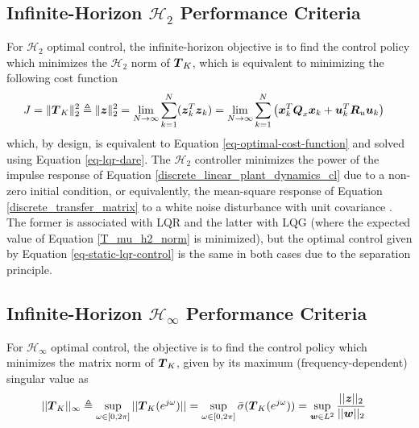 \subsection{Infinite-Horizon $\mathcal{H}_{2}$ Performance Criteria}
For $\mathcal{H}_{2}$ optimal control, the infinite-horizon objective is to find the control policy which minimizes the $\mathcal{H}_{2}$ norm of $\vb*{T}_{K}$, which is equivalent to minimizing the following cost function
\begin{equation}
\begin{aligned}
	J &= \lVert \vb*{T}_{K} \rVert_{2}^{2} \triangleq \lVert \vb*{z} \rVert_{2}^{2} = \lim_{N \to \infty} \sum_{k = 1}^{N} (\vb*{z}_{k}^{T}\vb*{z}_{k})
	= \lim_{N \to \infty} \sum_{k = 1}^{N} \big{(} \vb*{x}_{k}^{T} \vb*{Q}_{x} \vb*{x}_{k} + \vb*{u}_{k}^{T} \vb*{R}_{u} \vb*{u}_{k} \big{)}
\end{aligned} \label{T_mu_h2_norm}
\end{equation}
which, by design, is equivalent to Equation \eqref{eq-optimal-cost-function} and solved using Equation \eqref{eq-lqr-dare}.  The $\mathcal{H}_{2}$ controller minimizes the power of the impulse response of Equation \eqref{discrete_linear_plant_dynamics_cl} due to a non-zero initial condition, or equivalently, the mean-square response of Equation \eqref{discrete_transfer_matrix} to a white noise disturbance with unit covariance \cite{van2020data}.  The former is associated with LQR and the latter with LQG (where the expected value of Equation \eqref{T_mu_h2_norm} is minimized), but the optimal control given by Equation \eqref{eq-static-lqr-control} is the same in both cases due to the separation principle.

\subsection{Infinite-Horizon $\mathcal{H}_{\infty}$ Performance Criteria}
For $\mathcal{H}_{\infty}$ optimal control, the objective is to find the control policy which minimizes the matrix norm of $\vb*{T}_{K}$, given by its maximum (frequency-dependent) singular value as
\begin{equation}
\begin{aligned}
	||\vb*{T}_{K}||_{\infty} &\triangleq \sup_{\omega \in \left[0, 2 \pi \right]} ||\vb*{T}_{K}(e^{j\omega})||
	= \sup_{\omega \in \left[0, 2 \pi \right]} \bar{\sigma}(\vb*{T}_{K}(e^{j\omega}))
	= \sup_{\vb*{w} \in L^{2}} \frac{||\vb*{z}||_{2}}{||\vb*{w}||_{2}}
\end{aligned} \label{hinf_norm_cost}
\end{equation}

